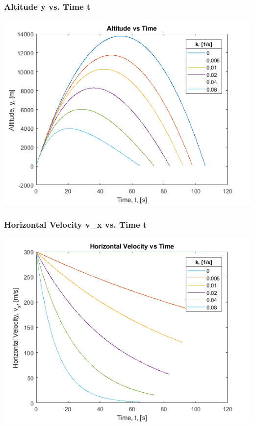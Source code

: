 \documentclass[oneside]{article}
\begin{document}
\subsubsection{Altitude y vs. Time t}
\includegraphics [width=\linewidth*4/5]{graph_y-t.png}
\subsubsection{Horizontal Velocity v\_x vs. Time t}
\includegraphics [width=\linewidth*4/5]{graph_u-t.png}
\end{document}
